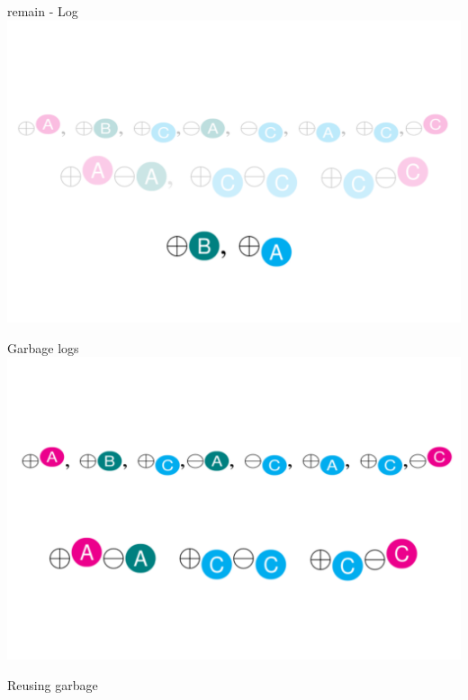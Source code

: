 \documentclass[english]{beamer} %
\begin{document}
\begin{frame}{remain - Log}
\includegraphics[scale=0.5]{fig/remain}
\end{frame}

\begin{frame}{Garbage logs}
\includegraphics[scale=0.5]{fig/example_gl}
\end{frame}

\begin{frame}{Reusing garbage}

\end{frame}
\end{document}
